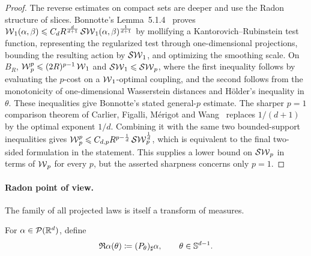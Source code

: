 \begin{proof}
	The reverse estimates on compact sets are deeper and use the Radon structure of slices. Bonnotte's Lemma~5.1.4~\cite{bonnotte2013unidimensional} proves
	$\operatorname{\mathcal{W}}_1(\alpha,\beta) \leqslant C_dR^{\frac{d}{d+1}}\operatorname{\mathcal{SW}}_1(\alpha,\beta)^{\frac{1}{d+1}}$
	by mollifying a Kantorovich--Rubinstein test function, representing the regularized test through one-dimensional projections, bounding the resulting action by $\operatorname{\mathcal{SW}}_1$, and optimizing the smoothing scale. On $B_R$,
	$\operatorname{\mathcal{W}}_p^p\leqslant(2R)^{p-1}\operatorname{\mathcal{W}}_1$ and $\operatorname{\mathcal{SW}}_1\leqslant\operatorname{\mathcal{SW}}_p$,
	where the first inequality follows by evaluating the $p$-cost on a $\operatorname{\mathcal{W}}_1$-optimal coupling, and the second follows from the monotonicity of one-dimensional Wasserstein distances and H\"older's inequality in $\theta$. These inequalities give Bonnotte's stated general-$p$ estimate. The sharper $p=1$ comparison theorem of Carlier, Figalli, M\'erigot and Wang~\cite{CarlierFigalliMerigotWang2025SlicedW1} replaces $1/(d+1)$ by the optimal exponent $1/d$. Combining it with the same two bounded-support inequalities gives
	$\operatorname{\mathcal{W}}_p^p \leqslant C_{d,p}R^{p-\frac1d}\operatorname{\mathcal{SW}}_p^{\frac1d}$,
	which is equivalent to the final two-sided formulation in the statement. This supplies a lower bound on $\operatorname{\mathcal{SW}}_p$ in terms of $\operatorname{\mathcal{W}}_p$ for every $p$, but the asserted sharpness concerns only $p=1$.
\end{proof}

\paragraph{Radon point of view.}\label{rem-sliced-radon-viewpoint}
The family of all projected laws is itself a transform of measures.
\begin{defn}\label{def-measure-radon-transform}
For $\alpha\in\mathcal{P}(\mathbb{R}^d)$, define
\[
\mathfrak R\alpha(\theta)\coloneqq(P_\theta)_\sharp\alpha,
\qquad \theta\in\mathbb{S}^{d-1}.
\]
\end{defn}

